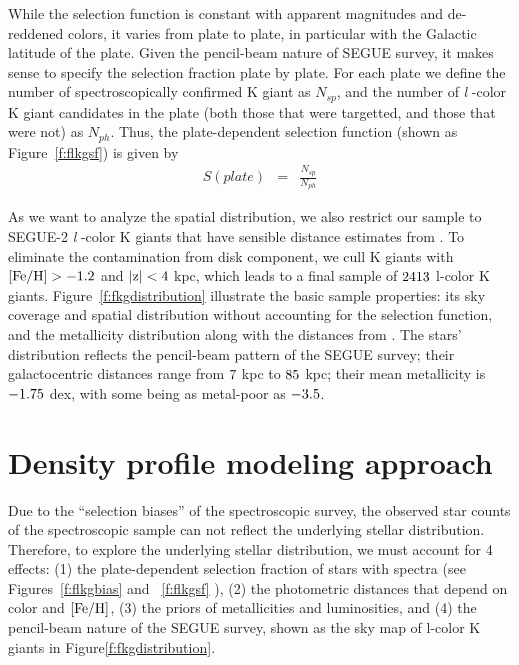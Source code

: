 \documentclass[12pt,preprint]{aastex}
\newcommand{\feh}{{\rm [Fe/H]}}
\begin{document}
While the selection function is constant with apparent magnitudes and de-reddened colors, it varies from plate to plate, in particular with the Galactic latitude of the plate.   Given the pencil-beam nature of SEGUE survey, it makes sense to specify the selection fraction plate by plate. 
 For each plate we define the number of spectroscopically confirmed K giant as $N_{sp}$, and the number of \textit{l} -color K giant candidates in the plate (both those that were targetted, and those that were not) as $N_{ph}$. Thus, the plate-dependent selection function (shown as Figure~\ref{f:flkgsf}) is given by
\begin{eqnarray}
S(plate) &=& \frac{N_{sp}}{N_{ph}}   
 \end{eqnarray}

As we want to analyze the spatial distribution, we also restrict our sample to SEGUE-2 
\textit{l} -color K giants that have sensible distance estimates from \citet{Xue2014}. To eliminate the contamination from disk
component, we cull K giants with $\rm \feh>-1.2$ and $\rm |z|<4~$kpc, which leads to a final sample of $\rm 2413$
l-color K giants. Figure~\ref{f:fkgdistribution} illustrate the basic sample properties:  its sky coverage and spatial 
distribution without accounting for the selection function, and the metallicity distribution along with the distances
from \citet{Xue2014}.  The stars' distribution reflects the pencil-beam pattern of the SEGUE survey; their galactocentric
distances range  from $\rm 7~$kpc to $\rm 85~$kpc; their mean metallicity is $\rm -1.75~$dex, with some being 
as metal-poor as $\rm -3.5$. 


\section{Density profile modeling approach}
Due to the ``selection biases'' of the spectroscopic survey, the observed star counts of the spectroscopic sample can not reflect the underlying stellar distribution. Therefore, to explore the underlying stellar distribution, we must account for 4 effects: (1) the plate-dependent selection fraction of stars with spectra (see Figures~\ref{f:flkgbias} and ~\ref{f:flkgsf} ), (2) the photometric distances that depend on color and $\rm \feh$, (3) the priors of metallicities and luminosities, and (4) the pencil-beam nature of the SEGUE survey, shown as the sky map of l-color K giants in Figure\ref{f:fkgdistribution}. 
\end{document}
